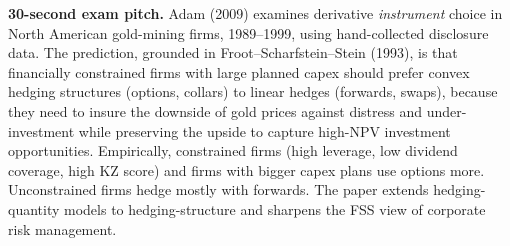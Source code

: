 \documentclass[11pt]{article}
\begin{document}
\begin{keybox}
\textbf{30-second exam pitch.} Adam (2009) examines derivative \emph{instrument} choice in North American gold-mining firms, 1989--1999, using hand-collected disclosure data. The prediction, grounded in Froot--Scharfstein--Stein (1993), is that financially constrained firms with large planned capex should prefer convex hedging structures (options, collars) to linear hedges (forwards, swaps), because they need to insure the downside of gold prices against distress and under-investment while preserving the upside to capture high-NPV investment opportunities. Empirically, constrained firms (high leverage, low dividend coverage, high KZ score) and firms with bigger capex plans use options more. Unconstrained firms hedge mostly with forwards. The paper extends hedging-quantity models to hedging-structure and sharpens the FSS view of corporate risk management.
\end{keybox}
\end{document}
